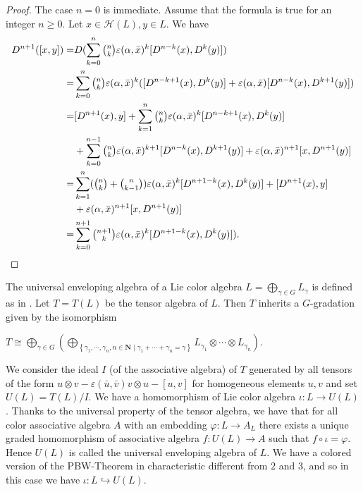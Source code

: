 \documentclass[11pt, twoside]{article}
\begin{document}
\begin{proof}
    The case $n=0 $ is immediate. 
    Assume that the formula is true for an integer $n\geq 0$. Let $x\in \mathcal{H}(L), y\in L$. We have \begin{align*}
        D^{n+1}([x,y]) = &D( \sum\limits_{k=0}^n \tbinom{n}{k}\varepsilon(\alpha,\bar{x})^k [D^{n-k}(x),D^k(y)] ) \\  =& \sum\limits_{k=0}^n \tbinom{n}{k}\varepsilon(\alpha,\bar{x})^k ([D^{n-k+1}(x),D^k(y)] + \varepsilon(\alpha,\bar{x})[D^{n-k}(x),D^{k+1}(y)]) \\  = &[D^{n+1}(x),y]+ \sum\limits_{k=1}^n \tbinom{n}{k}\varepsilon(\alpha,\bar{x})^k [D^{n-k+1}(x),D^k(y)] \\ & + \sum\limits_{k=0}^{n-1} \tbinom{n}{k}\varepsilon(\alpha,\bar{x})^{k+1} [D^{n-k}(x),D^{k+1}(y)] + \varepsilon(\alpha,\bar{x})^{n+1} [x,D^{n+1}(y)] \\  =&  \sum\limits_{k=1}^n (\tbinom{n}{k}+\tbinom{n}{k-1}) \varepsilon(\alpha,\bar{x})^k [D^{n+1-k}(x),D^k(y)] +[D^{n+1}(x),y]\\ &+ \varepsilon(\alpha,\bar{x})^{n+1} [x,D^{n+1}(y)] \\ = & \sum\limits_{k=0}^{n+1} \tbinom{n+1}{k}\varepsilon(\alpha,\bar{x})^k [D^{n+1-k}(x),D^k(y)] ).
    \end{align*} 
    
\end{proof}


The universal enveloping algebra of a Lie color algebra $L= \bigoplus\limits_{\gamma\in G}L_\gamma $ is defined as in \cite{BMPZ92}. Let $T=T(L)$ be the tensor algebra of $L$. Then $T$ inherits a $G $-gradation given by the isomorphism \begin{center}
    $T\cong \bigoplus\limits_{\gamma\in G} (\bigoplus\limits_{\left\{\gamma_1,\cdots,\gamma_n, n\in \mathbf{N}\mid \gamma_1+\cdots+\gamma_n= \gamma   \right\} }L_{\gamma_1}\otimes\cdots\otimes L_{\gamma_n}).  $ \end{center} 
    We consider the ideal $I$ (of the associative algebra) of $T$ generated by all tensors of the form $u\otimes v - \varepsilon(\bar{u},\bar{v})v\otimes u -[u,v]$ for homogeneous elements $u,v$ and set $U(L)= T(L)/I $. We have a homomorphism of Lie color algebra $\iota : L\to U(L) $. Thanks to  the universal property of the tensor algebra, we have that for all color associative algebra $A$ with an embedding $\varphi:L\to A_{L} $ there exists a unique graded homomorphism of associative algebra $f:U(L)\to A $ such that $f\circ \iota= \varphi $. 
    Hence $U(L)$ is called the universal enveloping algebra of $L$. We have a colored version of the PBW-Theorem in characteristic different from $2$ and $3$, and so in this case we have  $\iota:L\hookrightarrow U(L) $.
\end{document}

